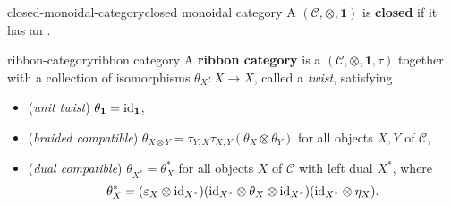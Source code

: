 \begin{topic}{closed-monoidal-category}{closed monoidal category}
    A   $(\mathcal{C}, \otimes, \textbf{1})$ is \textbf{closed} if it has an .
\end{topic}

\begin{topic}{ribbon-category}{ribbon category}
    A \textbf{ribbon category} is a   $(\mathcal{C}, \otimes, \textbf{1}, \tau)$ together with a collection of isomorphisms $\theta_X : X \to X$, called a \textit{twist}, satisfying
    \begin{itemize}
        \item (\textit{unit twist}) $\theta_\textbf{1} = \text{id}_\textbf{1}$,
        \item (\textit{braided compatible}) $\theta_{X \otimes Y} = \tau_{Y, X} \tau_{X, Y} (\theta_X \otimes \theta_Y)$ for all objects $X, Y$ of $\mathcal{C}$,
        \item (\textit{dual compatible}) $\theta_{X^*} = \theta_X^*$ for all objects $X$ of $\mathcal{C}$ with left dual $X^*$, where
        \[ \theta_X^* = (\varepsilon_X \otimes \text{id}_{X^*}) (\text{id}_{X^*} \otimes \theta_X \otimes \text{id}_{X^*}) (\text{id}_{X^*} \otimes \eta_X) . \]
    \end{itemize}
\end{topic}

